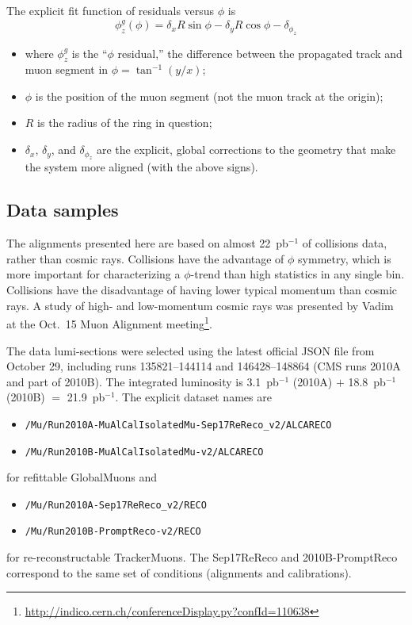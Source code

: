 \documentclass[12pt]{article}
\begin{document}
The explicit fit function of residuals versus $\phi$ is
\begin{equation}
\phi^g_z(\phi) = \delta_x R \sin\phi - \delta_y R \cos\phi - \delta_{\phi_z}
\label{eqn:fitfunc}
\end{equation}
\begin{itemize}
\item where $\phi^g_z$ is the ``$\phi$ residual,'' the difference between
the propagated track and muon segment in $\phi = \tan^{-1}(y/x)$;
\item $\phi$ is the position of the muon segment (not the muon track
  at the origin);
\item $R$ is the radius of the ring in question;
\item $\delta_x$, $\delta_y$, and $\delta_{\phi_z}$ are the explicit,
  global corrections to the geometry that make the system more aligned
  (with the above signs).
\end{itemize}

\subsection{Data samples}

The alignments presented here are based on almost 22~pb$^{-1}$ of
collisions data, rather than cosmic rays.  Collisions have the
advantage of $\phi$ symmetry, which is more important for
characterizing a $\phi$-trend than high statistics in any single bin.
Collisions have the disadvantage of having lower typical momentum than
cosmic rays.  A study of high- and low-momentum cosmic rays was
presented by Vadim at the Oct.~15 Muon Alignment
meeting\footnote{\url{http://indico.cern.ch/conferenceDisplay.py?confId=110638}}.

The data lumi-sections were selected using the latest official JSON
file from October 29, including runs 135821--144114 and 146428--148864
(CMS runs 2010A and part of 2010B).  The integrated luminosity is
3.1~pb$^{-1}$ (2010A) $+$ 18.8~pb$^{-1}$ (2010B) $=$ 21.9~pb$^{-1}$.
The explicit dataset names are
\begin{itemize}
\item \tt /Mu/Run2010A-MuAlCalIsolatedMu-Sep17ReReco\_v2/ALCARECO
\item \tt /Mu/Run2010B-MuAlCalIsolatedMu-v2/ALCARECO
\end{itemize}
for refittable GlobalMuons and
\begin{itemize}
\item \tt /Mu/Run2010A-Sep17ReReco\_v2/RECO
\item \tt /Mu/Run2010B-PromptReco-v2/RECO
\end{itemize}
for re-reconstructable TrackerMuons.  The Sep17ReReco and
2010B-PromptReco correspond to the same set of conditions (alignments
and calibrations).
\end{document}
